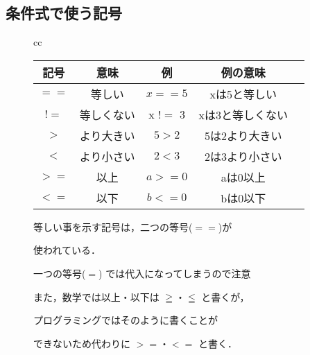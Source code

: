 \documentclass{jsarticle}
\begin{document}
\subsection{条件式で使う記号}
\begin{figure}[h]
	\begin{tabular}{cc}
		\begin{minipage}[c]{.5\textwidth}
			\begin{tabular}[t]{|c|c|c|c|c|}
				\hline
				記号 & 意味       & 例       & 例の意味         \\
				\hline \hline
				$==$ & 等しい     & $x == 5$ & xは5と等しい     \\ \hline
				$!=$ & 等しくない & x $!=$ 3 & xは3と等しくない \\ \hline
				$>$  & より大きい & $5 > 2$  & 5は2より大きい   \\ \hline
				$<$  & より小さい & $2 < 3$  & 2は3より小さい   \\ \hline
				$>=$ & 以上       & $a >= 0$ & aは0以上         \\ \hline
				$<=$ & 以下       & $b <= 0$ & bは0以下         \\ \hline
			\end{tabular}
		\end{minipage}
		\begin{minipage}[c]{.465\textwidth}
			\begin{screen}
				等しい事を示す記号は，二つの等号($==$)が \par 使われている． \par
				一つの等号($=$) では代入になってしまうので注意 \par
				また，数学では以上・以下は $\geqq$・$\leqq$ と書くが，\par プログラミングではそのように書くことが \par できないため代わりに $>=$・$<=$ と書く．
			\end{screen}
		\end{minipage}
	\end{tabular}
\end{figure}
\newpage
\end{document}
